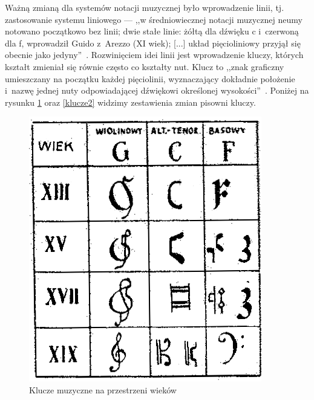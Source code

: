 \documentclass[polish,thesis,12pt]{dcsbook}
\begin{document}
Ważną zmianą dla systemów notacji muzycznej było wprowadzenie linii, tj. zastosowanie systemu liniowego --- ,,w średniowiecznej notacji muzycznej neumy notowano początkowo bez linii; dwie stałe linie: żółtą dla dźwięku c i~czerwoną dla f, wprowadził Guido z~Arezzo (XI wiek); [...] układ pięcioliniowy przyjął się obecnie jako jedyny''~\cite{Slowniczek}. Rozwinięciem idei linii jest wprowadzenie kluczy, których kształt zmieniał się równie często co kształty nut. Klucz to ,,znak graficzny umieszczany na początku każdej pięciolinii, wyznaczający dokładnie położenie i~nazwę jednej nuty odpowiadającej dźwiękowi określonej wysokości''~\cite{Slowniczek}. Poniżej na rysunku \ref{klucze} oraz \ref{klucze2} widzimy zestawienia zmian pisowni kluczy.

\begin{figure}[H]
  \centering
  \begin{minipage}[t]{0.45\linewidth}
    \includegraphics[scale=2.25,bb=0 0 92 105]{img/klucze.png}
    \caption{Klucze muzyczne na przestrzeni wieków~\cite{PodstawoweWiadomosci}}
    \label{klucze}
  \end{minipage}
  \quad
  \begin{minipage}[t]{0.45\linewidth}

\end{minipage}
\end{figure}
\end{document}
